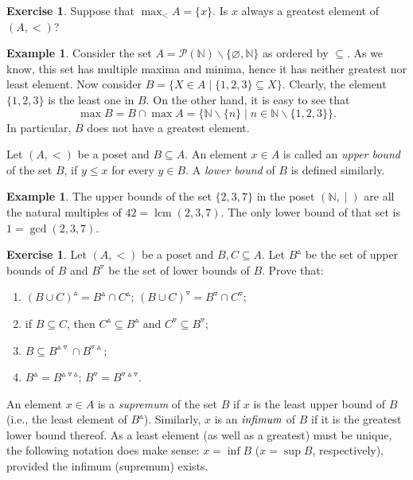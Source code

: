 \documentclass[12pt,notitlepage]{article}
\theoremstyle{plain}
\theoremstyle{definition}
\newtheorem{exc}[thm]{Exercise}
\newtheorem{exm}[thm]{Example}
\theoremstyle{plain}
\newcommand{\N}{\mathbb{N}}
\newcommand{\sbs}{\subseteq}
\renewcommand{\setminus}{\smallsetminus}
\newcommand{\void}{\varnothing}
\newcommand{\mP}{\mathcal{P}}
\newcommand{\1}{\mathbf{1}}
\newcommand{\0}{\mathbf{0}}
\newcommand{\dvd}{\mathop{\mid}}
\DeclareMathOperator{\lcm}{lcm}
\begin{document}
%
\begin{exc}
Suppose that $\max_{<} A = \{x\}$. Is $x$ always a greatest element of $(A, <)$?
\end{exc}

\begin{exm}
Consider the set $A = \mP(\N) \setminus \{\void, \N\}$ as ordered by ${\sbs}$. As we know, this set has multiple maxima and minima, hence it has neither greatest nor least element. Now consider $B = \{ X \in A \mid \{1,2,3\} \sbs X \}$. Clearly, the element $\{1,2,3\}$ is the least one in $B$. On the other hand, it is easy to see that
$$\max B = B \cap \max A = \{ \N \setminus \{ n \} \mid n \in \N \setminus \{1,2,3\} \}.$$
In particular, $B$ does not have a greatest element.
\end{exm}

Let $(A, <)$ be a poset and $B \sbs A$. An element $x \in A$ is called an \emph{upper bound} of the set $B$, if $y \leq x$ for every $y \in B$. A \emph{lower bound} of $B$ is defined similarly.

\begin{exm}
The upper bounds of the set $\{2,3,7\}$ in the poset $(\N, {\dvd})$ are all the natural multiples of $42 = \lcm(2,3,7)$. The only lower bound of that set is $1 = \gcd(2,3,7)$.
\end{exm}
\begin{exc}
Let $(A, <)$ be a poset and $B,C \sbs A$. Let $B^\vartriangle$ be the set of upper bounds of $B$ and $B^\triangledown$ be the set of lower bounds of $B$. Prove that:
\begin{enumerate}
\item $(B \cup C)^\vartriangle = B^\vartriangle \cap C^\vartriangle$; $(B \cup C)^\triangledown = B^\triangledown \cap C^\triangledown$;
\item if $B \sbs C$, then $C^\vartriangle \sbs B^\vartriangle$ and $C^\triangledown \sbs B^\triangledown$;
\item $B \sbs B^{\vartriangle \triangledown} \cap B^{\triangledown \vartriangle}$;
\item $B^\vartriangle = B^{\vartriangle \triangledown \vartriangle}$; $B^\triangledown = B^{\triangledown \vartriangle \triangledown}$.
\end{enumerate}
\end{exc}

An element $x \in A$ is a \emph{supremum} of the set $B$ if $x$ is the least upper bound of $B$ (i.e., the least element of $B^\vartriangle$). Similarly, $x$ is an $\emph{infimum}$ of $B$ if it is the greatest lower bound thereof. As a least element (as well as a greatest) must be unique, the following notation does make sense:  $x = \inf B$ ($x = \sup B$, respectively), provided the infimum (supremum) exists.
\end{document}
